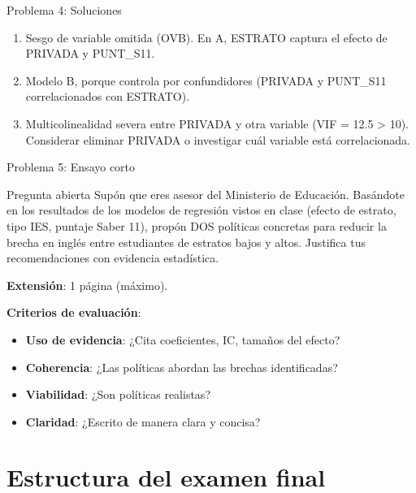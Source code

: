 \documentclass[aspectratio=169, 11pt]{beamer}
\begin{document}
\begin{frame}{Problema 4: Soluciones}
\begin{enumerate}
\item Sesgo de variable omitida (OVB). En A, ESTRATO captura el efecto de PRIVADA y PUNT\_S11.
\item Modelo B, porque controla por confundidores (PRIVADA y PUNT\_S11 correlacionados con ESTRATO).
\item Multicolinealidad severa entre PRIVADA y otra variable (VIF = 12.5 > 10). Considerar eliminar PRIVADA o investigar cuál variable está correlacionada.
\end{enumerate}
\end{frame}

\begin{frame}{Problema 5: Ensayo corto}
\begin{alertblock}{Pregunta abierta}
Supón que eres asesor del Ministerio de Educación. Basándote en los resultados de los modelos de regresión vistos en clase (efecto de estrato, tipo IES, puntaje Saber 11), propón DOS políticas concretas para reducir la brecha en inglés entre estudiantes de estratos bajos y altos. Justifica tus recomendaciones con evidencia estadística.

\vspace{0.2cm}
\textbf{Extensión}: 1 página (máximo).
\end{alertblock}

\vspace{0.2cm}
\textbf{Criterios de evaluación}:
\begin{itemize}
\item \textbf{Uso de evidencia}: ¿Cita coeficientes, IC, tamaños del efecto?
\item \textbf{Coherencia}: ¿Las políticas abordan las brechas identificadas?
\item \textbf{Viabilidad}: ¿Son políticas realistas?
\item \textbf{Claridad}: ¿Escrito de manera clara y concisa?
\end{itemize}
\end{frame}

\section{Estructura del examen final}
\end{document}
